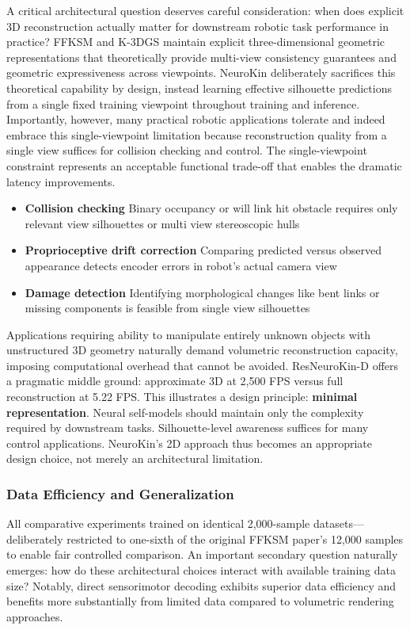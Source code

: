 ﻿\documentclass[11pt,a4paper]{article}
\begin{document}
A critical architectural question deserves careful consideration: when does explicit 3D reconstruction actually matter for downstream robotic task performance in practice? FFKSM and K-3DGS maintain explicit three-dimensional geometric representations that theoretically provide multi-view consistency guarantees and geometric expressiveness across viewpoints. NeuroKin deliberately sacrifices this theoretical capability by design, instead learning effective silhouette predictions from a single fixed training viewpoint throughout training and inference. Importantly, however, many practical robotic applications tolerate and indeed embrace this single-viewpoint limitation because reconstruction quality from a single view suffices for collision checking and control. The single-viewpoint constraint represents an acceptable functional trade-off that enables the dramatic latency improvements.

\begin{itemize}
\item \textbf{Collision checking} Binary occupancy or will link hit obstacle requires only relevant view silhouettes or multi view stereoscopic hulls
\item \textbf{Proprioceptive drift correction} Comparing predicted versus observed appearance detects encoder errors in robot's actual camera view
\item \textbf{Damage detection} Identifying morphological changes like bent links or missing components is feasible from single view silhouettes
\end{itemize}

Applications requiring ability to manipulate entirely unknown objects with unstructured 3D geometry naturally demand volumetric reconstruction capacity, imposing computational overhead that cannot be avoided. ResNeuroKin-D offers a pragmatic middle ground: approximate 3D at 2,500 FPS versus full reconstruction at 5.22 FPS. This illustrates a design principle: \textbf{minimal representation}. Neural self-models should maintain only the complexity required by downstream tasks. Silhouette-level awareness suffices for many control applications. NeuroKin's 2D approach thus becomes an appropriate design choice, not merely an architectural limitation.

\subsubsection{Data Efficiency and Generalization}

All comparative experiments trained on identical 2,000-sample datasets—deliberately restricted to one-sixth of the original FFKSM paper's 12,000 samples to enable fair controlled comparison. An important secondary question naturally emerges: how do these architectural choices interact with available training data size? Notably, direct sensorimotor decoding exhibits superior data efficiency and benefits more substantially from limited data compared to volumetric rendering approaches.
\end{document}
